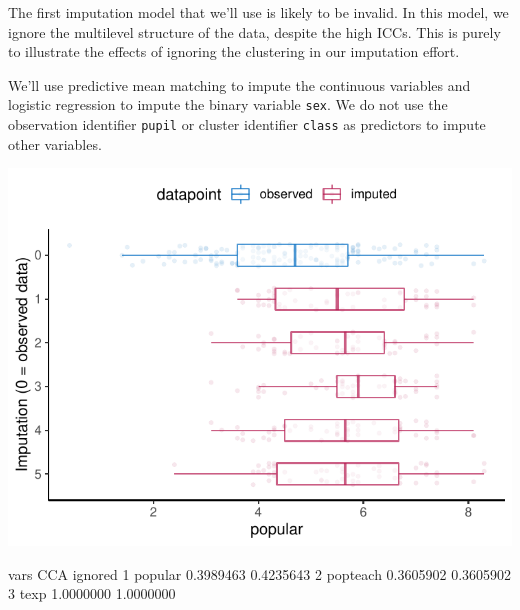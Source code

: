 \documentclass[
]{jss}
\begin{document}
The first imputation model that we'll use is likely to be invalid. In
this model, we ignore the multilevel structure of the data, despite the
high ICCs. This is purely to illustrate the effects of ignoring the
clustering in our imputation effort.

We'll use predictive mean matching to impute the continuous variables
and logistic regression to impute the binary variable \texttt{sex}. We
do not use the observation identifier \texttt{pupil} or cluster
identifier \texttt{class} as predictors to impute other variables.

\begin{CodeChunk}
\end{CodeChunk}

\begin{CodeChunk}


\begin{center}\includegraphics{Manuscript_files/figure-latex/pop_ignored_eval-1} \end{center}

\begin{CodeOutput}
      vars       CCA   ignored
1  popular 0.3989463 0.4235643
2 popteach 0.3605902 0.3605902
3     texp 1.0000000 1.0000000
\end{CodeOutput}
\end{CodeChunk}
\end{document}
